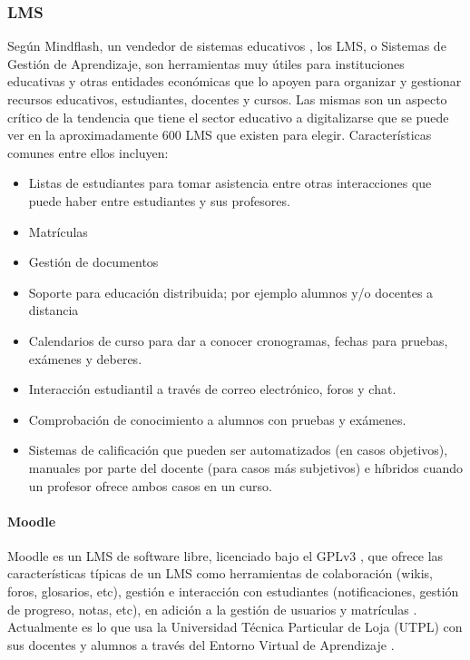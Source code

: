 \subsubsection{LMS}
Según Mindflash, un vendedor de sistemas educativos \citep{MINDFLASH-ABOUT}, los LMS, o Sistemas de Gestión de Aprendizaje, son herramientas muy útiles para instituciones educativas y otras entidades económicas que lo apoyen para organizar y gestionar recursos educativos, estudiantes, docentes y cursos. Las mismas son un aspecto crítico de la tendencia que tiene el sector educativo a digitalizarse que se puede ver en la aproximadamente 600 LMS  que existen para elegir. Características comunes entre ellos incluyen: \citep{MINDFLASH-LMS}
\begin{itemize}
	\item Listas de estudiantes para tomar asistencia entre otras interacciones que puede haber entre estudiantes y sus profesores.
    \item Matrículas
    \item Gestión de documentos
    \item Soporte para educación distribuida; por ejemplo alumnos y/o docentes a distancia
    \item Calendarios de curso para dar a conocer cronogramas, fechas para pruebas, exámenes y deberes.
    \item Interacción estudiantil a través de correo electrónico, foros y chat.
    \item Comprobación de conocimiento a alumnos con pruebas y exámenes.
    \item Sistemas de calificación que pueden ser automatizados (en casos objetivos), manuales por parte del docente (para casos más subjetivos) e híbridos cuando un profesor ofrece ambos casos en un curso.
\end{itemize}

\paragraph{Moodle}
Moodle es un LMS  de software libre, licenciado bajo el GPLv3 \citep{MOODLE-GIT-License},  que ofrece las características típicas de un LMS  como herramientas de colaboración (wikis, foros, glosarios, etc), gestión e interacción con estudiantes (notificaciones, gestión de progreso, notas, etc), en adición a la gestión de usuarios y matrículas \citep{MOODLE-DOCS-Features}. Actualmente es lo que usa la Universidad Técnica Particular de Loja (UTPL) con sus docentes y alumnos a través del Entorno Virtual de Aprendizaje \citep{Lopez-Jorge}.

